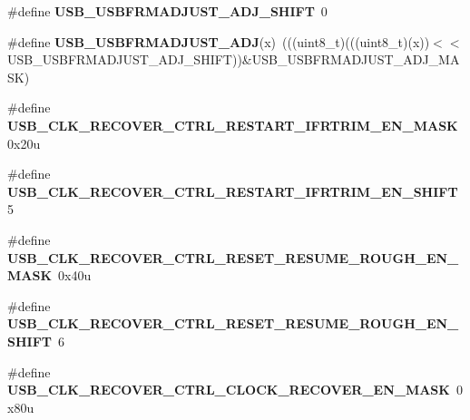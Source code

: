 \begin{DoxyCompactItemize}
\item 
\#define {\bfseries U\+S\+B\+\_\+\+U\+S\+B\+F\+R\+M\+A\+D\+J\+U\+S\+T\+\_\+\+A\+D\+J\+\_\+\+S\+H\+I\+FT}~0\hypertarget{group__USB__Register__Masks_ga81985f8c59f9aa0c0340a70136b55098}{}\label{group__USB__Register__Masks_ga81985f8c59f9aa0c0340a70136b55098}

\item 
\#define {\bfseries U\+S\+B\+\_\+\+U\+S\+B\+F\+R\+M\+A\+D\+J\+U\+S\+T\+\_\+\+A\+DJ}(x)~(((uint8\+\_\+t)(((uint8\+\_\+t)(x))$<$$<$U\+S\+B\+\_\+\+U\+S\+B\+F\+R\+M\+A\+D\+J\+U\+S\+T\+\_\+\+A\+D\+J\+\_\+\+S\+H\+I\+FT))\&U\+S\+B\+\_\+\+U\+S\+B\+F\+R\+M\+A\+D\+J\+U\+S\+T\+\_\+\+A\+D\+J\+\_\+\+M\+A\+SK)\hypertarget{group__USB__Register__Masks_ga9425a289b2e719d6aad583a33ddf1e4b}{}\label{group__USB__Register__Masks_ga9425a289b2e719d6aad583a33ddf1e4b}

\item 
\#define {\bfseries U\+S\+B\+\_\+\+C\+L\+K\+\_\+\+R\+E\+C\+O\+V\+E\+R\+\_\+\+C\+T\+R\+L\+\_\+\+R\+E\+S\+T\+A\+R\+T\+\_\+\+I\+F\+R\+T\+R\+I\+M\+\_\+\+E\+N\+\_\+\+M\+A\+SK}~0x20u\hypertarget{group__USB__Register__Masks_ga77dc2ce9a51eff644d449abfa8228935}{}\label{group__USB__Register__Masks_ga77dc2ce9a51eff644d449abfa8228935}

\item 
\#define {\bfseries U\+S\+B\+\_\+\+C\+L\+K\+\_\+\+R\+E\+C\+O\+V\+E\+R\+\_\+\+C\+T\+R\+L\+\_\+\+R\+E\+S\+T\+A\+R\+T\+\_\+\+I\+F\+R\+T\+R\+I\+M\+\_\+\+E\+N\+\_\+\+S\+H\+I\+FT}~5\hypertarget{group__USB__Register__Masks_gafd08f3eb421e7db973f9940a2111f0a7}{}\label{group__USB__Register__Masks_gafd08f3eb421e7db973f9940a2111f0a7}

\item 
\#define {\bfseries U\+S\+B\+\_\+\+C\+L\+K\+\_\+\+R\+E\+C\+O\+V\+E\+R\+\_\+\+C\+T\+R\+L\+\_\+\+R\+E\+S\+E\+T\+\_\+\+R\+E\+S\+U\+M\+E\+\_\+\+R\+O\+U\+G\+H\+\_\+\+E\+N\+\_\+\+M\+A\+SK}~0x40u\hypertarget{group__USB__Register__Masks_gae30340de1a58627aeb4aac99ba1b0418}{}\label{group__USB__Register__Masks_gae30340de1a58627aeb4aac99ba1b0418}

\item 
\#define {\bfseries U\+S\+B\+\_\+\+C\+L\+K\+\_\+\+R\+E\+C\+O\+V\+E\+R\+\_\+\+C\+T\+R\+L\+\_\+\+R\+E\+S\+E\+T\+\_\+\+R\+E\+S\+U\+M\+E\+\_\+\+R\+O\+U\+G\+H\+\_\+\+E\+N\+\_\+\+S\+H\+I\+FT}~6\hypertarget{group__USB__Register__Masks_ga30a7d01d4ba637c538f8dc499436b81e}{}\label{group__USB__Register__Masks_ga30a7d01d4ba637c538f8dc499436b81e}

\item 
\#define {\bfseries U\+S\+B\+\_\+\+C\+L\+K\+\_\+\+R\+E\+C\+O\+V\+E\+R\+\_\+\+C\+T\+R\+L\+\_\+\+C\+L\+O\+C\+K\+\_\+\+R\+E\+C\+O\+V\+E\+R\+\_\+\+E\+N\+\_\+\+M\+A\+SK}~0x80u\hypertarget{group__USB__Register__Masks_gafea91b9d1976f9212d7caf1ae1d6e20d}{}\label{group__USB__Register__Masks_gafea91b9d1976f9212d7caf1ae1d6e20d}


\end{DoxyCompactItemize}
